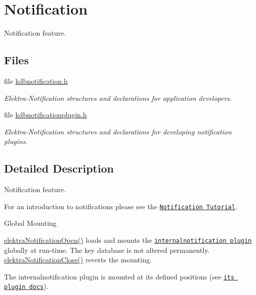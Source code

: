 \hypertarget{group__kdbnotification}{}\section{Notification}
\label{group__kdbnotification}


Notification feature.  


\subsection*{Files}
\begin{DoxyCompactItemize}
\item 
file \hyperlink{kdbnotification_8h}{kdbnotification.\+h}
\begin{DoxyCompactList}\small\item\em Elektra-\/\+Notification structures and declarations for application developers. \end{DoxyCompactList}\item 
file \hyperlink{kdbnotificationplugin_8h}{kdbnotificationplugin.\+h}
\begin{DoxyCompactList}\small\item\em Elektra-\/\+Notification structures and declarations for developing notification plugins. \end{DoxyCompactList}\end{DoxyCompactItemize}


\subsection{Detailed Description}
Notification feature. 

For an introduction to notifications please see the \href{doc_tutorials_notifications_md.html}{\tt Notification Tutorial}.

\begin{DoxyParagraph}{Global Mounting}

\end{DoxyParagraph}
\hyperlink{kdbnotification_8h_aeae96154abdb5fdbf1b34a01e2b23e44}{elektra\+Notification\+Open()} loads and mounts the \href{https://www.libelektra.org/plugins/internalnotification}{\tt internalnotification plugin} globally at run-\/time. The key database is not altered permanently. \hyperlink{kdbnotification_8h_a5685dafbd4131011365628d6d9213594}{elektra\+Notification\+Close()} reverts the mounting.

The internalnotification plugin is mounted at its defined positions (see \href{https://www.libelektra.org/plugins/internalnotification}{\tt its plugin docs}).



